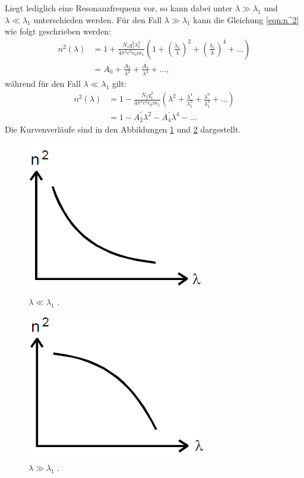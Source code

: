 Liegt lediglich eine Resonanzfrequenz vor, so kann dabei unter $\lambda \gg \lambda_1$ und $\lambda \ll \lambda_1$ unterschieden werden.
Für den Fall $\lambda \gg \lambda_1$ kann die Gleichung \eqref{eqn:n^2} wie folgt geschrieben werden:
\begin{align}
n^2(\lambda)&=1+\frac{N_1 q_1^2 \lambda_1^2}{4\pi^2 c^2 \epsilon_0 m_1}\left(1+\left(\frac{\lambda_1}{\lambda}\right)^2+\left(\frac{\lambda_1}{\lambda}\right)^4+\ldots\right)\nonumber\\
			&=A_0+\frac{A_2}{\lambda^2}+\frac{A_4}{\lambda^4}+\ldots \label{eq:n^2 für l>>l1} \text{,}
\end{align}
während für den Fall $\lambda \ll \lambda_1$ gilt:
\begin{align}
n^2(\lambda)&=1-\frac{N_1 q_1^2 }{4\pi^2 c^2 \epsilon_0 m_1}\left(\lambda^2+\frac{\lambda^4}{\lambda_1^2}+\frac{\lambda^6}{\lambda_1^4}+\ldots\right)\nonumber\\
			&=1-A_2^\prime\lambda^2-A_4^\prime\lambda^4-\ldots \label{eq:n^2 für l<<l1}
\end{align}
Die Kurvenverläufe sind in den Abbildungen \ref{fig:case1} und \ref{fig:case2} dargestellt.\newline \newline
\begin{minipage}{0.45\textwidth}
\begin{figure}[H]
  \centering
  \includegraphics[scale=0.7]{Text/Bilder/case1.png}
  \caption{$\lambda \ll \lambda_1$ \cite[22]{sample}.}
  \label{fig:case1}
\end{figure}
\end{minipage}
\begin{minipage}{0.45\textwidth}
\begin{figure}[H]
  \centering
  \includegraphics[scale=0.7]{Text/Bilder/case2.png}
  \caption{$\lambda \gg \lambda_1$ \cite[22]{sample}.}
  \label{fig:case2}
\end{figure}
\end{minipage}
